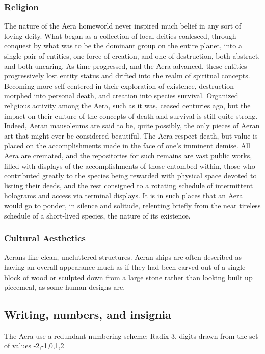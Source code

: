 \subsubsection{Religion}
The nature of the Aera homeworld never inspired much belief in any
sort of loving deity. What began as a collection of local deities
coalesced, through conquest by what was to be the dominant group on
the entire planet, into a single pair of entities, one force of
creation, and one of destruction, both abstract, and both uncaring. As
time progressed, and the Aera advanced, these entities progressively
lost entity status and drifted into the realm of spiritual
concepts. Becoming more self-centered in their exploration of
existence, destruction morphed into personal death, and creation into
species survival. Organized religious activity among the Aera, such as
it was, ceased centuries ago, but the impact on their culture of the
concepts of death and survival is still quite strong. Indeed, Aeran
mausoleums are said to be, quite possibly, the only pieces of Aeran
art that might ever be considered beautiful. The Aera respect death,
but value is placed on the accomplishments made in the face of one's
imminent demise. All Aera are cremated, and the repositories for such
remains are vast public works, filled with displays of the
accomplishments of those entombed within, those who contributed
greatly to the species being rewarded with physical space devoted to
listing their deeds, and the rest consigned to a rotating schedule of
intermittent holograms and access via terminal displays. It is in such
places that an Aera would go to ponder, in silence and solitude,
relenting briefly from the near tireless schedule of a short-lived
species, the nature of its existence.

\subsubsection{Cultural Aesthetics}

Aerans like clean, uncluttered structures. Aeran ships are often
described as having an overall appearance much as if they had been
carved out of a single block of wood or sculpted down from a large
stone rather than looking built up piecemeal, as some human designs
are.

\subsection{Writing, numbers, and insignia}
The Aera use a redundant numbering scheme:
Radix 3, digits drawn from the set of values {-2,-1,0,1,2} 

